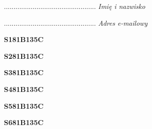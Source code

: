 \begin{turn}{90}\begin{minipage}{\linewidth} \vspace{20mm} ................................................  \textit{Imię i nazwisko}\end{minipage}\end{turn}

\begin{turn}{90}\begin{minipage}{\linewidth} \vspace{20mm} ................................................  \textit{Adres e-mailowy}\end{minipage}\end{turn}

\begin{turn}{90}\huge \begin{minipage}{\linewidth} \vspace{10mm}\textbf{S181B135C}\end{minipage}\end{turn}

\begin{turn}{90}\huge \begin{minipage}{\linewidth} \vspace{10mm}\textbf{S281B135C}\end{minipage}\end{turn}

\begin{turn}{90}\huge \begin{minipage}{\linewidth} \vspace{10mm}\textbf{S381B135C}\end{minipage}\end{turn}

\begin{turn}{90}\huge \begin{minipage}{\linewidth} \vspace{10mm}\textbf{S481B135C}\end{minipage}\end{turn}

\begin{turn}{90}\huge \begin{minipage}{\linewidth} \vspace{10mm}\textbf{S581B135C}\end{minipage}\end{turn}

\begin{turn}{90}\huge \begin{minipage}{\linewidth} \vspace{10mm}\textbf{S681B135C}\end{minipage}\end{turn}

